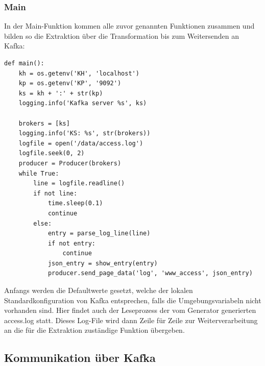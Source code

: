 \subsubsection{Main}
In der Main-Funktion kommen alle zuvor genannten Funktionen zusammen und bilden so die Extraktion über die Transformation bis zum Weitersenden an Kafka: 
\begin{lstlisting}[caption={Main-Code}]
def main():
    kh = os.getenv('KH', 'localhost')
    kp = os.getenv('KP', '9092')
    ks = kh + ':' + str(kp)
    logging.info('Kafka server %s', ks)

    brokers = [ks]
    logging.info('KS: %s', str(brokers))
    logfile = open('/data/access.log')
    logfile.seek(0, 2)
    producer = Producer(brokers)
    while True:
        line = logfile.readline()
        if not line:
            time.sleep(0.1)
            continue
        else:
            entry = parse_log_line(line)
            if not entry:
                continue
            json_entry = show_entry(entry)
            producer.send_page_data('log', 'www_access', json_entry)
\end{lstlisting}
\vspace{4mm}\par
Anfangs werden die Defaultwerte gesetzt, welche der lokalen Standardkonfiguration von Kafka entsprechen, falls die Umgebungsvariabeln nicht vorhanden sind. Hier findet auch der Leseprozess der vom Generator generierten access.log statt. Dieses Log-File wird dann Zeile für Zeile zur Weiterverarbeitung an die für die Extraktion zuständige Funktion übergeben.
\newpage
\subsection{Kommunikation über Kafka}
